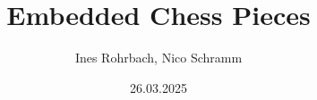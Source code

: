 
\title{Embedded Chess Pieces}
\newcommand{\subtitle}{Projekt-Dokumentation}

\newcommand{\thedate}{26.03.2025}
\date{\thedate}

\author{Ines Rohrbach, Nico Schramm}

\newcommand{\semester}{WiSe 24/25}
\newcommand{\module}{Softwareentwicklung für Eingebettete Systeme}

\newcommand{\prof}{Prof. Dr. rer. nat. Jens Wagner\\M. Eng. Marian Ulbricht}

\newcommand{\faculty}{Fakultät Informatik und Medien}
\newcommand{\university}{Hochschule für Technik, Wirtschaft und Kultur Leipzig}

\newcommand{\projecturl}{https://github.com/nicosrm/24-emb-chess/}

